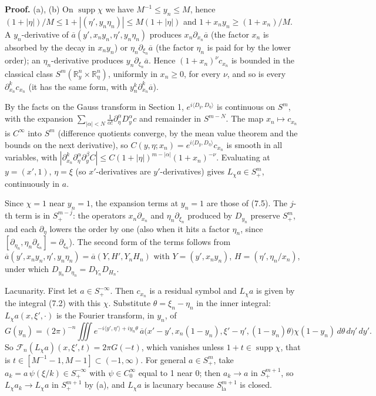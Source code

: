 \documentclass[
  11pt,
]{article}
\begin{document}
\textbf{Proof.} (a), (b) On \(\operatorname{supp}\chi\) we have
\(M^{-1}\leq y_n\leq M\), hence
\((1+|\eta|)/M\leq1+|(\eta',y_n\eta_n)|\leq M(1+|\eta|)\) and
\(1+x_ny_n\geq(1+x_n)/M\). A \(y_n\)-derivative of
\(\overline a(y',x_ny_n,\eta',y_n\eta_n)\) produces
\(x_n\partial_{x_n}\overline a\) (the factor \(x_n\) is absorbed by the
decay in \(x_ny_n\)) or \(\eta_n\partial_{\xi_n}\overline a\) (the
factor \(\eta_n\) is paid for by the lower order); an
\(\eta_n\)-derivative produces \(y_n\partial_{\xi_n}\overline a\). Hence
\((1+x_n)^\nu c_{x_n}\) is bounded in the classical class
\(S^m(\mathbb R^n_y\times\mathbb R^n_\eta)\), uniformly in \(x_n\geq0\),
for every \(\nu\), and so is every \(\partial_{x_n}^kc_{x_n}\) (it has
the same form, with \(y_n^k\partial_{x_n}^k\overline a\)).

By the facts on the Gauss transform in Section 1,
\(e^{i\langle D_y,D_\eta\rangle}\) is continuous on \(S^m\), with the
expansion
\(\sum_{|\alpha|<N}\frac1{\alpha!}\partial_\eta^\alpha D_y^\alpha c\)
and remainder in \(S^{m-N}\). The map \(x_n\mapsto c_{x_n}\) is
\(C^\infty\) into \(S^m\) (difference quotients converge, by the mean
value theorem and the bounds on the next derivative), so
\(C(y,\eta;x_n)=e^{i\langle D_y,D_\eta\rangle}c_{x_n}\) is smooth in all
variables, with
\(|\partial^k_{x_n}\partial^\alpha_\eta\partial^\beta_yC|\leq C(1+|\eta|)^{m-|\alpha|}(1+x_n)^{-\nu}\).
Evaluating at \(y=(x',1)\), \(\eta=\xi\) (so \(x'\)-derivatives are
\(y'\)-derivatives) gives \(L_\chi a\in S^m_+\), continuously in \(a\).

Since \(\chi=1\) near \(y_n=1\), the expansion terms at \(y_n=1\) are
those of (7.5). The \(j\)-th term is in \(S^{m-j}_+\): the operators
\(x_n\partial_{x_n}\) and \(\eta_n\partial_{\xi_n}\) produced by
\(D_{y_n}\) preserve \(S^m_+\), and each \(\partial_\eta\) lowers the
order by one (also when it hits a factor \(\eta_n\), since
\([\partial_{\eta_n},\eta_n\partial_{\xi_n}]=\partial_{\xi_n}\)). The
second form of the terms follows from
\(\overline a(y',x_ny_n,\eta',y_n\eta_n)=\overline a(Y,H',Y_nH_n)\) with
\(Y=(y',x_ny_n)\), \(H=(\eta',\eta_n/x_n)\), under which
\(D_{y_n}D_{\eta_n}=D_{Y_n}D_{H_n}\).

Lacunarity. First let \(a\in S^{-\infty}_+\). Then \(c_{x_n}\) is a
residual symbol and \(L_\chi a\) is given by the integral (7.2) with
this \(\chi\). Substitute \(\theta=\xi_n-\eta_n\) in the inner integral:
\(L_\chi a(x,\xi',\cdot)\) is the Fourier transform, in \(y_n\), of \[
G(y_n)=(2\pi)^{-n}\iiint e^{-i\langle y',\eta'\rangle+iy_n\theta}\,\overline a\big(x'-y',x_n(1-y_n),\xi'-\eta',(1-y_n)\theta\big)\chi(1-y_n)\,d\theta\,d\eta'\,dy' .
\] So \(\mathcal F_n(L_\chi a)(x,\xi',t)=2\pi G(-t)\), which vanishes
unless \(1+t\in\operatorname{supp}\chi\), that is
\(t\in[M^{-1}-1,M-1]\subset(-1,\infty)\). For general \(a\in S^m_+\),
take \(a_k=a\,\psi(\xi/k)\in S^{-\infty}_+\) with \(\psi\in C_0^\infty\)
equal to 1 near 0; then \(a_k\to a\) in \(S^{m+1}_+\), so
\(L_\chi a_k\to L_\chi a\) in \(S^{m+1}_+\) by (a), and \(L_\chi a\) is
lacunary because \(S^{m+1}_{\mathrm{la}}\) is closed.
\end{document}
